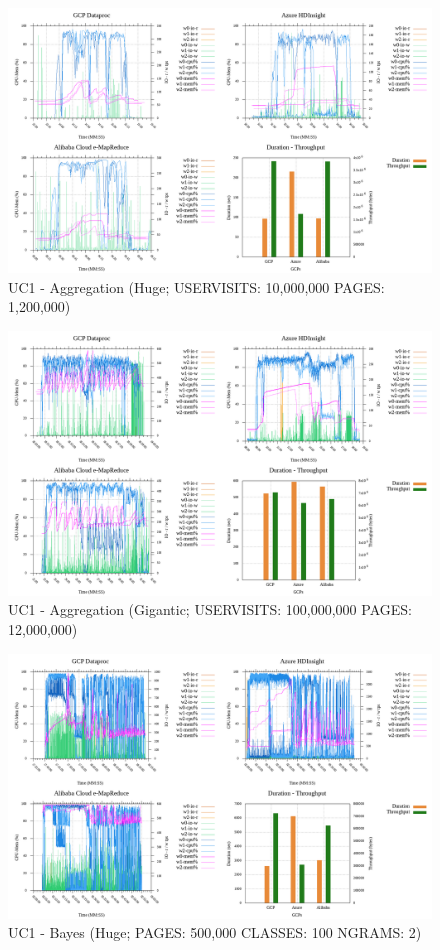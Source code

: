\documentclass[review]{elsarticle}
\begin{document}
\begin{figure}[p]
	\includegraphics[width=\textwidth]{uc1-aggreg-h-cmidt}
	\caption{UC1 - Aggregation (Huge; USERVISITS: 10,000,000 PAGES: 1,200,000)}
	\label{fig:uc1-aggreg-h-cmidt}
	\centering
\end{figure}

\begin{figure}[p]
	\includegraphics[width=\textwidth]{uc1-aggreg-g-cmidt}
	\caption{UC1 - Aggregation (Gigantic; USERVISITS: 100,000,000 PAGES: 12,000,000)}
	\label{fig:uc1-aggreg-g-cmidt}
	\centering
\end{figure}

\begin{figure}[p]
	\includegraphics[width=\textwidth]{uc1-bayes-h-cmidt}
	\caption{UC1 - Bayes (Huge; PAGES: 500,000 CLASSES: 100 NGRAMS: 2)}
	\label{fig:uc1-bayes-h-cmidt}
	\centering
\end{figure}
\end{document}
